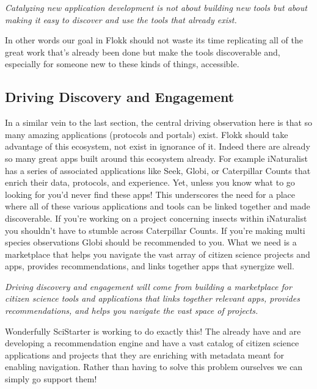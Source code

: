\documentclass[10pt,a5paper]{book}
\begin{document}
\textit{Catalyzing new application development is not about building new tools but about making it easy to discover and use the tools that already exist. }\linebreak

In other words our goal in Flokk should not waste its time replicating all of the great work that's already been done but make the tools discoverable and, especially for someone new to these kinds of things, accessible. 

\subsection{Driving Discovery and Engagement}
In a similar vein to the last section, the central driving observation here is that so many amazing applications (protocols and portals) exist. Flokk should take advantage of this ecosystem, not exist in ignorance of it. Indeed there are already so many great apps built around this ecosystem already. For example iNaturalist has a series of associated applications like Seek, Globi, or Caterpillar Counts that enrich their data, protocols, and experience. Yet, unless you know what to go looking for you'd never find these apps! This underscores the need for a place where all of these various applications and tools can be linked together and made discoverable. If you're working on a project concerning insects within iNaturalist you shouldn't have to stumble across Caterpillar Counts. If you're making multi species observations Globi should be recommended to you. What we need is a marketplace that helps you navigate the vast array of citizen science projects and apps, provides recommendations, and links together apps that synergize well.\linebreak

\textit{Driving discovery and engagement will come from building a marketplace for citizen science tools and applications that links together relevant apps, provides recommendations, and helps you navigate the vast space of projects. }\linebreak

Wonderfully SciStarter is working to do exactly this! The already have and are developing a recommendation engine and have a vast catalog of citizen science applications and projects that they are enriching with metadata meant for enabling navigation. Rather than having to solve this problem ourselves we can simply go support them!
\end{document}
